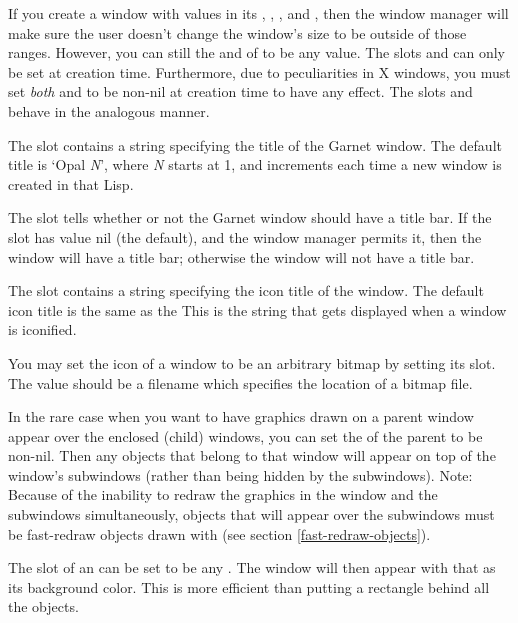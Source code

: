   
If you create a window with values in its , ,
, and , then the window manager will make sure
the user doesn't change the
window's size to be outside of those ranges.  However, you can
still  the  and  of  to be
any value.  The slots  and  can only be
set at creation time.  Furthermore, due to peculiarities in X windows, you
must set {\it both}  and 
to be non-{\sc nil} at creation time to have any effect.
The slots  and  behave in the analogous
manner.

The  slot contains a string specifying the title of the Garnet
window.  The default title is `Opal {\it N}', where {\it N} starts at 1, and
increments each time a new window is created in that Lisp.

The  slot tells whether or not the Garnet window should
have a title bar.  If the slot has value {\sc nil} (the default), and the window
manager permits it, then the window will have a title bar; otherwise the
window will not have a title bar.

The  slot contains a string specifying the icon title
of the window.  The default icon title is the same as the
  This is the string that gets displayed when a window is
iconified.

You may set the icon of a window to be an arbitrary bitmap by setting
its  slot.  The value should be a filename which
specifies the location of a bitmap file.

In the rare case when you want to have graphics drawn on a parent
window appear over the enclosed (child) windows, you can set the
 of the parent to be non-{\sc nil}.
Then any objects that belong to that window will appear on top of
the window's subwindows (rather than being hidden by the subwindows).
Note:  Because of the inability to redraw the graphics in the window and the
subwindows simultaneously, objects that will appear over the subwindows must
be fast-redraw objects drawn with 
(see section \ref{fast-redraw-objects}).

The  slot of an  can be set
to be any .  The window will then appear with that as its
background color.  This is more efficient than putting a rectangle
behind all the objects.

